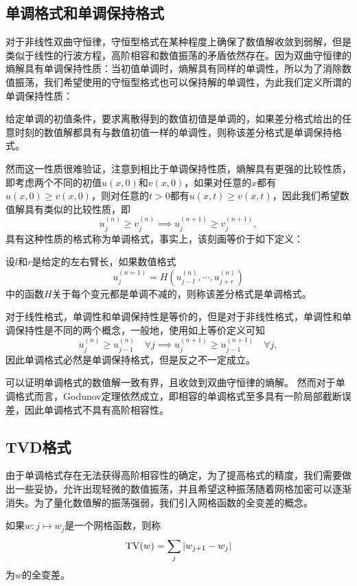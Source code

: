 \documentclass[a4paper,10pt]{ctexart}
\begin{document}
\subsection{单调格式和单调保持格式}
对于非线性双曲守恒律，守恒型格式在某种程度上确保了数值解收敛到弱解，但是类似于线性的行波方程，高阶相容和数值振荡的矛盾依然存在。因为双曲守恒律的熵解具有单调保持性质：当初值单调时，熵解具有同样的单调性，所以为了消除数值振荡，我们希望使用的守恒型格式也可以保持解的单调性，为此我们定义所谓的单调保持性质：
\begin{definition}
    给定单调的初值条件，要求离散得到的数值初值是单调的，如果差分格式给出的任意时刻的数值解都具有与数值初值一样的单调性，则称该差分格式是单调保持格式。
\end{definition}
然而这一性质很难验证，注意到相比于单调保持性质，熵解具有更强的比较性质，即考虑两个不同的初值$ u(x,0) $和$ v(x,0) $，如果对任意的$ x $都有$ u(x,0)\geqslant v(x,0) $，则对任意的$ t>0 $都有$ u(x,t)\geqslant v(x,t) $，因此我们希望数值解具有类似的比较性质，即
\[
    u^{(n)}_j\geqslant v^{(n)}_j \implies u^{(n+1)}_j\geqslant v^{(n+1)}_j,  
\]
具有这种性质的格式称为单调格式，事实上，该刻画等价于如下定义：
\begin{definition}
    设$ l $和$ r $是给定的左右臂长，如果数值格式
    \begin{equation}
        u_j^{(n=1)} = H(u_{j-l}^{(n)},\cdots ,u_{j+r}^{(n)})
    \end{equation}
    中的函数$ H $关于每个变元都是单调不减的，则称该差分格式是单调格式。
\end{definition}
对于线性格式，单调性和单调保持性是等价的，但是对于非线性格式，单调性和单调保持性是不同的两个概念，一般地，使用如上等价定义可知
\[
    u_j^{(n)} \geqslant u_{j-1}^{(n)}\quad \forall j \implies u_j^{(n+1)} \geqslant u_{j-1}^{(n+1)}\quad \forall j,
\]
因此单调格式必然是单调保持格式，但是反之不一定成立。

可以证明单调格式的数值解一致有界，且收敛到双曲守恒律的熵解。
然而对于单调格式而言，Godunov定理依然成立，即相容的单调格式至多具有一阶局部截断误差，因此单调格式不具有高阶相容性。

\subsection{TVD格式}
由于单调格式存在无法获得高阶相容性的确定，为了提高格式的精度，我们需要做出一些妥协，允许出现轻微的数值振荡，并且希望这种振荡随着网格加密可以逐渐消失。为了量化数值解的振荡强弱，我们引入网格函数的全变差的概念。
\begin{definition}
    如果$ w:j\mapsto w_j $是一个网格函数，则称
    \begin{equation}
        {\rm TV}(w) = \sum_{j} |w_{j+1} - w_j|
    \end{equation}
    为$ w $的全变差。
\end{definition}
\end{document}

